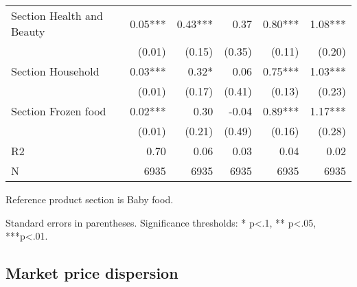 \documentclass[english]{article}
\begin{document}
\begin{table}
\begin{threeparttable}
\begin{tabular}{lrrrrr}
Section Health and Beauty                & 0.05***  & 0.43***  & 0.37     & 0.80***  & 1.08***   \\
                                         & (0.01)   & (0.15)   & (0.35)   & (0.11)   & (0.20)    \\
Section Household                        & 0.03***  & 0.32*    & 0.06     & 0.75***  & 1.03***   \\
                                         & (0.01)   & (0.17)   & (0.41)   & (0.13)   & (0.23)    \\
Section Frozen food                      & 0.02***  & 0.30     & -0.04    & 0.89***  & 1.17***   \\
                                         & (0.01)   & (0.21)   & (0.49)   & (0.16)   & (0.28)    \\
\midrule
R2                                       & 0.70     & 0.06     & 0.03     & 0.04     & 0.02      \\
N                                        & 6935     & 6935     & 6935     & 6935     & 6935      \\
\bottomrule
\bottomrule
\end{tabular}
\begin{tablenotes}
      \small
      \item Reference product section is Baby food.
	  \item Standard errors in parentheses. Significance thresholds: * p<.1, ** p<.05, ***p<.01.
\end{tablenotes}
\end{threeparttable}
\end{table}



\subsection{Market price dispersion}
\end{document}
